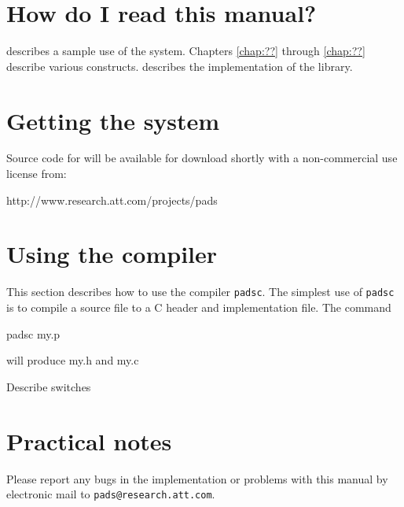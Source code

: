 \section{How do I read this manual?}
 describes a sample use of the \pads{} system.
Chapters \ref{chap:??} through \ref{chap:??} describe various
constructs. 
 describes the implementation of the
library. 


\section{Getting the \pads{} system}
Source code for \pads{} will be available for download shortly with
a non-commercial use license from: 
\begin{centercode}
http://www.research.att.com/projects/pads
\end{centercode}


\section{Using the \pads{} compiler}
This section describes how to use the \pads{} compiler \texttt{padsc}.
The simplest use of \texttt{padsc} is to compile a \padsl{} source file
to a C header and implementation file.  The command
\begin{centercode}
padsc my.p
\end{centercode} %
will produce my.h and my.c

Describe switches

\section{Practical notes}
Please report any bugs in the \pads{} implementation or problems with
this manual by electronic mail to \texttt{pads@research.att.com}.
